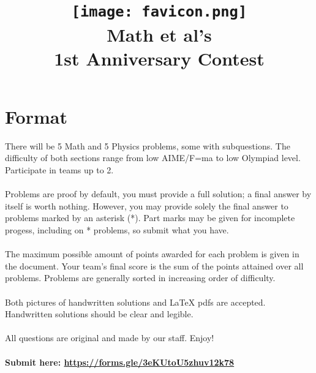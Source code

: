 


\sffamily


\lhead{\textsf{\textbf{\textcolor{meablue}{Math et al}}}} 
\title{\texttt{[image: favicon.png]} \\ \textbf{\textcolor{meablue}{Math et al's}} \\ 1st Anniversary Contest}
\date{}
\author{}
\titlepage
\maketitle


\section*{\textsf{\textbf{Format}}}
There will be 5 Math and 5 Physics problems, some with subquestions. The difficulty of both sections range from low AIME/F=ma to low Olympiad level. Participate in teams up to 2.
\\ \\
Problems are proof by default, you must provide a full solution; a final answer by itself is worth nothing. However, you may provide solely the final answer to problems marked by an asterisk (*). Part marks may be given for incomplete progess, including on * problems, so submit what you have.
\\ \\
The maximum possible amount of points awarded for each problem is given in the document. Your team's final score is the sum of the points attained over all problems. Problems are generally sorted in increasing order of difficulty.
\\ \\
Both pictures of handwritten solutions and \textrm{\LaTeX} pdfs are accepted. Handwritten solutions should be clear and legible.
\\ \\
All questions are original and made by our staff. Enjoy!
\\ \\
\textbf{Submit here: \url{https://forms.gle/3eKUtoU5zhuv12k78}}

